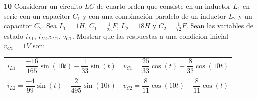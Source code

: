 \documentclass[10pt,a4paper]{article} %
\begin{document}
	\textbf{10} Considerar un circuito $LC$ de cuarto orden que consiste en un inductor $L_1$ en serie con un capacitor $C_1$ y con una combinación paralelo de un inductor $L_2$ y un capacitor $C_2$. Sea $L_1=1H$, $C_1=\frac{1}{25}F$, $L_2=18H$ y $C_2=\frac{1}{72}F$. Sean las variables de estado $i_{L1}$, $i_{L2}$,$v_{C1}$, $v_{C1}$. Mostrar que las respuestas a una condicion inicial $v_{C1}=1V$ son:
	\begin{center}
		\begin{tabular}{cc}
			$i_{L1}=\dfrac{-16}{165}\sin(10t)-\dfrac{1}{33}\sin(t)$& $v_{C1}=\dfrac{25}{33}\cos(t)+\dfrac{8}{33}\cos(10t)$\\
			&\\ 
			$i_{L2}=\dfrac{-4}{99}\sin(t)+\dfrac{2}{495}\sin(10t)$ & $v_{C2}=\dfrac{8}{11}\cos(10t)-\dfrac{8}{11}\cos(t)$\\
		\end{tabular} 
	\end{center}
	
\end{document}

